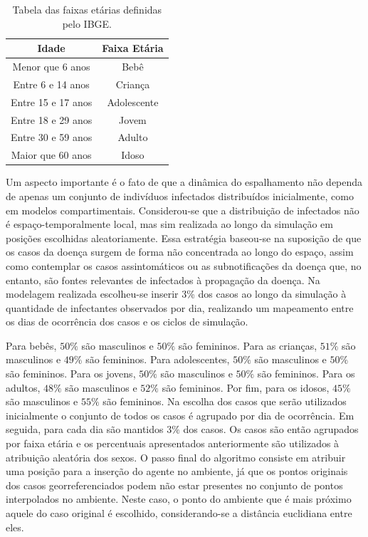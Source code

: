 \begin{table}[H]
\centering
\begin{tabular}{c|c}
 \textbf{Idade} 	& \textbf{Faixa Etária}	\\ \hline
 Menor que 6 anos 	& Bebê			\\
 Entre 6 e 14 anos 	& Criança		\\
 Entre 15 e 17 anos 	& Adolescente		\\
 Entre 18 e 29 anos 	& Jovem			\\
 Entre 30 e 59 anos 	& Adulto		\\
 Maior que 60 anos 	& Idoso			\\
\end{tabular}
\caption{Tabela das faixas etárias definidas pelo IBGE.}
\label{tab:faixasEtariasIBGE}
\end{table}

Um aspecto importante é o fato de que a dinâmica do espalhamento não dependa de apenas um conjunto de indivíduos infectados distribuídos inicialmente, como em modelos compartimentais. Considerou-se que a distribuição de infectados não é espaço-temporalmente local, mas sim realizada ao longo da simulação em posições escolhidas aleatoriamente. Essa estratégia baseou-se na suposição de que os casos da doença surgem de forma não concentrada ao longo do espaço, assim como contemplar os casos assintomáticos ou as subnotificações da doença que, no entanto, são fontes relevantes de infectados à propagação da doença. Na modelagem realizada escolheu-se inserir 3\% dos casos ao longo da simulação à quantidade de infectantes observados por dia, realizando um mapeamento entre os dias de ocorrência dos casos e os ciclos de simulação.

Para bebês, $50\%$ são masculinos e $50\%$ são femininos. Para as crianças, $51\%$ são masculinos e $49\%$ são femininos. Para adolescentes, $50\%$ são masculinos e $50\%$ são femininos. Para os jovens, $50\%$ são masculinos e $50\%$ são femininos. Para os adultos, $48\%$ são masculinos e $52\%$ são femininos. Por fim, para os idosos, $45\%$ são masculinos e $55\%$ são femininos. Na escolha dos casos que serão utilizados inicialmente o conjunto de todos os casos é agrupado por dia de ocorrência. Em seguida, para cada dia são mantidos $3\%$ dos casos. Os casos são então agrupados por faixa etária e os percentuais apresentados anteriormente são utilizados à atribuição aleatória dos sexos. O passo final do algoritmo consiste em atribuir uma posição para a inserção do agente no ambiente, já que os pontos originais dos casos georreferenciados podem não estar presentes no conjunto de pontos interpolados no ambiente. Neste caso, o ponto do ambiente que é mais próximo aquele do caso original é escolhido, considerando-se a distância euclidiana entre eles. 

